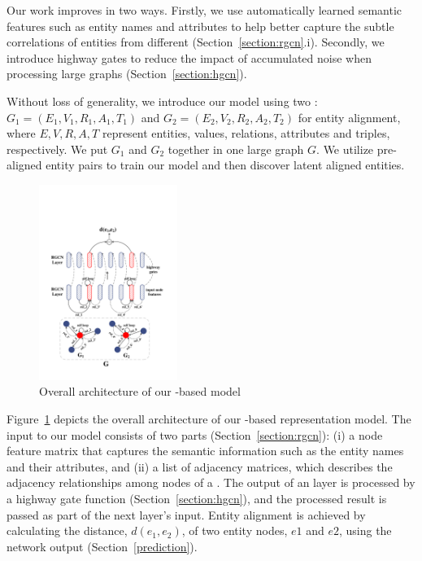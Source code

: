  Our work improves \RGCNs in two ways. Firstly, we use automatically learned semantic features such as entity names and attributes to
 help \RGCN better capture the subtle correlations of entities from different \KGs (Section~\ref{section:rgcn}.i).
    Secondly, we introduce highway gates to reduce the impact of accumulated noise when processing large graphs (Section~\ref{section:hgcn}).




	

 Without loss of generality, we introduce our model using two \KGs: $G_1 = (E_1,V_1,R_1,A_1,T_1)$ and $G_2 =
(E_2,V_2,R_2,A_2,T_2)$ for entity alignment, where $E,V,R,A,T$ represent entities, values, relations, attributes and triples, respectively. 	
We put $G_1$ and $G_2$ together in one large graph $G$. We utilize pre-aligned entity pairs to train our model and then discover latent
aligned entities.

\begin{figure}[t!]
	\centering
	\includegraphics[width=0.4\textwidth]{figures/RGCN.pdf}
	\caption{Overall architecture of our \RGCN-based model}\label{fig:all}
\end{figure}

 Figure~\ref{fig:all} depicts the overall architecture of our \RGCN-based \KG representation model. 	
	The input to our model consists of two parts (Section~\ref{section:rgcn}): (i) a node feature matrix that captures the semantic information such as the entity
  names and their attributes, and (ii) a list of adjacency matrices, which describes the adjacency relationships among nodes of a \KG.
    The output of an \RGCN layer is processed by a highway gate function (Section~\ref{section:hgcn}), and the processed result is passed as part of
    the next layer's input. Entity alignment is achieved by calculating the distance, $d(e_1, e_2)$, of two entity nodes, $e1$ and $e2$, using the
   network output (Section~\ref{prediction}).



